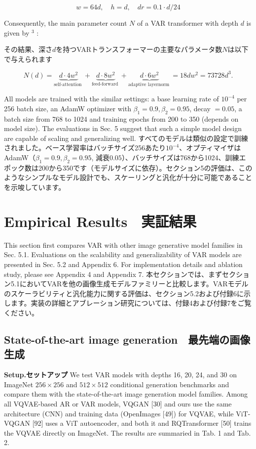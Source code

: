 \documentclass{article}
\begin{document}
$$
w=64 d, \quad h=d, \quad d r=0.1 \cdot d / 24
$$

Consequently, the main parameter count $N$ of a VAR transformer with depth $d$ is given by ${ }^{3}$ :

その結果、深さ$d$を持つVARトランスフォーマーの主要なパラメータ数$N$は以下で与えられます

$$
N(d)=\underbrace{d \cdot 4 w^{2}}_{\text {self-attention }}+\underbrace{d \cdot 8 w^{2}}_{\text {feed-forward }}+\underbrace{d \cdot 6 w^{2}}_{\text {adaptive layernorm }}=18 d w^{2}=73728 d^{3} .
$$

All models are trained with the similar settings: a base learning rate of $10^{-4}$ per 256 batch size, an AdamW optimizer with $\beta_{1}=0.9, \beta_{2}=0.95$, decay $=0.05$, a batch size from 768 to 1024 and training epochs from 200 to 350 (depends on model size). The evaluations in Sec. 5 suggest that such a simple model design are capable of scaling and generalizing well.
すべてのモデルは類似の設定で訓練されました。ベース学習率はバッチサイズ256あたり$10^{-4}$、オプティマイザはAdamW（$\beta_1 = 0.9, \beta_2 = 0.95$, 減衰$0.05$）、バッチサイズは768から1024、訓練エポック数は200から350です（モデルサイズに依存）。セクション5の評価は、このようなシンプルなモデル設計でも、スケーリングと汎化が十分に可能であることを示唆しています。


\section*{Empirical Results　実証結果}
This section first compares VAR with other image generative model families in Sec. 5.1. Evaluations on the scalability and generalizability of VAR models are presented in Sec. 5.2 and Appendix 6. For implementation details and ablation study, please see Appendix 4 and Appendix 7.
本セクションでは、まずセクション5.1においてVARを他の画像生成モデルファミリーと比較します。VARモデルのスケーラビリティと汎化能力に関する評価は、セクション5.2および付録6に示します。実装の詳細とアブレーション研究については、付録4および付録7をご覧ください。

\subsection*{State-of-the-art image generation　最先端の画像生成}
\textbf{Setup.セットアップ} We test VAR models with depths 16, 20, 24, and 30 on ImageNet $256 \times 256$ and $512 \times 512$ conditional generation benchmarks and compare them with the state-of-the-art image generation model families. Among all VQVAE-based AR or VAR models, VQGAN [30] and ours use the same architecture (CNN) and training data (OpenImages [49]) for VQVAE, while ViT-VQGAN [92] uses a ViT autoencoder, and both it and RQTransformer [50] trains the VQVAE directly on ImageNet. The results are summaried in Tab. 1 and Tab. 2.
\end{document}
